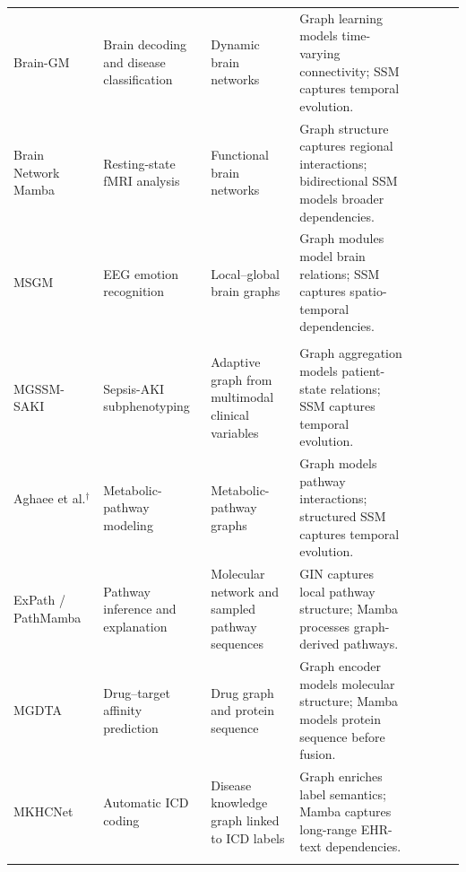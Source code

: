 \documentclass[acmsmall]{acmart}
\newcommand{\cmark}{\ding{51}}
\begin{document}
\begin{landscape}
\begin{longtable}{@{}
p{2.2cm}
p{2.8cm}
p{3.8cm}
p{7cm}
cccc
@{}}
Brain-GM~\cite{wang2024learning} &
Brain decoding and disease classification &
Dynamic brain networks &
Graph learning models time-varying connectivity; SSM captures temporal evolution. &
& \cmark & & \\

Brain Network Mamba~\cite{zhang2026brainnetworkmamba} &
Resting-state fMRI analysis &
Functional brain networks &
Graph structure captures regional interactions; bidirectional SSM models broader dependencies. &
& & & \cmark \\

MSGM~\cite{liu2026msgm} &
EEG emotion recognition &
Local--global brain graphs &
Graph modules model brain relations; SSM captures spatio-temporal dependencies. &
& \cmark & & \\


\midrule
\rowcolor{gray!12}
\multicolumn{8}{l}{\textbf{\textit{Clinical, biological, and molecular data}}} \\

MGSSM-SAKI~\cite{xu2024identifying} &
Sepsis-AKI subphenotyping &
Adaptive graph from multimodal clinical variables &
Graph aggregation models patient-state relations; SSM captures temporal evolution. &
\cmark & \cmark & & \\

Aghaee et al.$^{\dagger}$~\cite{aghaee2024graph} &
Metabolic-pathway modeling &
Metabolic-pathway graphs &
Graph models pathway interactions; structured SSM captures temporal evolution. &
& \cmark & & \\

ExPath / PathMamba~\cite{kotoge2026expath} &
Pathway inference and explanation &
Molecular network and sampled pathway sequences &
GIN captures local pathway structure; Mamba processes graph-derived pathways. &
& & \cmark & \\

MGDTA~\cite{han2024innovative} &
Drug--target affinity prediction &
Drug graph and protein sequence &
Graph encoder models molecular structure; Mamba models protein sequence before fusion. &
\cmark & & & \\

MKHCNet~\cite{lu2025mamba} &
Automatic ICD coding &
Disease knowledge graph linked to ICD labels &
Graph enriches label semantics; Mamba captures long-range EHR-text dependencies. &
\cmark & & & \\


\midrule
\rowcolor{gray!12}
\multicolumn{8}{l}{\textbf{\textit{Histopathology}}} \\


\end{longtable}
\end{landscape}
\end{document}
